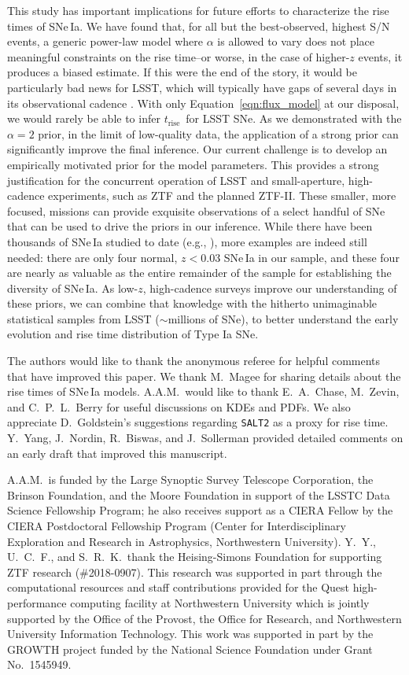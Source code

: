 \documentclass[twocolumn]{./aastex63}
\newcommand{\trise}{$t_\mathrm{rise}$}
\begin{document}
This study has important implications for future efforts to characterize the
rise times of SNe\,Ia. We have found that, for all but the best-observed,
highest S/N events, a generic power-law model where $\alpha$ is allowed to
vary does not place meaningful constraints on the rise time--or worse, in the
case of higher-$z$ events, it produces a biased estimate. If this were the end
of the story, it would be particularly bad news for LSST, which will typically
have gaps of several days in its observational cadence \citep{Ivezic19}. With
only Equation~\ref{eqn:flux_model} at our disposal, we would rarely be able to
infer \trise\ for LSST SNe. As we demonstrated with the $\alpha = 2$ prior, in
the limit of low-quality data, the application of a strong prior can
significantly improve the final inference. Our current challenge is to develop
an empirically motivated prior for the model parameters. This provides a
strong justification for the concurrent operation of LSST and small-aperture,
high-cadence experiments, such as ZTF and the planned ZTF-II. These smaller,
more focused, missions can provide exquisite observations of a select handful
of SNe that can be used to drive the priors in our inference. While there have
been thousands of SNe\,Ia studied to date (e.g., \citealt{Jones17}), more
examples are indeed still needed: there are only four normal, $z < 0.03$
SNe\,Ia in our sample, and these four are nearly as valuable as the entire
remainder of the sample for establishing the diversity of SNe\,Ia. As low-$z$,
high-cadence surveys improve our understanding of these priors, we can combine
that knowledge with the hitherto unimaginable statistical samples from LSST
($\sim$millions of SNe), to better understand the early evolution and rise
time distribution of Type Ia SNe.

\acknowledgements

The authors would like to thank the anonymous referee for helpful
comments that have improved this paper. We thank M.~Magee for sharing details
about the rise times of SNe\,Ia models. A.A.M.~would like to thank
E.~A.~Chase, M.~Zevin, and C.~P.~L.~Berry for useful discussions on KDEs and
PDFs. We also appreciate D.~Goldstein's suggestions regarding \texttt{SALT2}
as a proxy for rise time. Y.~Yang, J.~Nordin, R.~Biswas, and J.~Sollerman
provided detailed comments on an early draft that improved this manuscript.

A.A.M.~is funded by the Large Synoptic Survey Telescope Corporation, the
Brinson Foundation, and the Moore Foundation in support of the LSSTC Data
Science Fellowship Program; he also receives support as a CIERA Fellow by the
CIERA Postdoctoral Fellowship Program (Center for Interdisciplinary
Exploration and Research in Astrophysics, Northwestern University). Y.~Y.,
U.~C.~F., and S.~R.~K.~thank the Heising-Simons Foundation for supporting ZTF
research (\#2018-0907). This research was supported in part through the
computational resources and staff contributions provided for the Quest
high-performance computing facility at Northwestern University which is
jointly supported by the Office of the Provost, the Office for Research, and
Northwestern University Information Technology. This work was supported in
part by the GROWTH project funded by the National Science Foundation under
Grant No.~1545949.
\end{document}
